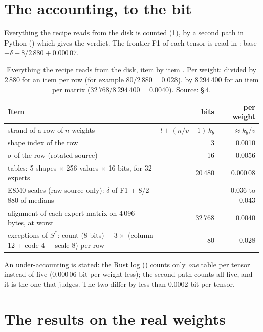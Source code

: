 \section{The accounting, to the bit}\label{t3gen:sec:compta}

Everything the recipe reads from the disk is counted (\cref{t3gen:tab:compta}), by a second path in Python () which gives the verdict. The frontier F1 of each tensor is read in : base $+ \delta + 8/2\,880 + 0.000\,07$.

\begin{table}[tbp]
\centering\footnotesize\setlength{\tabcolsep}{3pt}
\begin{tabularx}{\linewidth}{@{}>{\raggedright\arraybackslash}X r r@{}}
\toprule
Item & bits & per weight \\
\midrule
strand of a row of $n$ weights & $l + (n/v - 1)\,k_b$ & $\approx k_b/v$ \\
shape index of the row & 3 & 0.0010 \\
$\sigma$ of the row (rotated source) & 16 & 0.0056 \\
tables: 5 shapes $\times$ 256 values $\times$ 16 bits, for 32 experts & 20\,480 & 0.000\,08 \\
E8M0 scales (raw source only): $\delta$ of F1 + 8/2\,880 of medians & & 0.036 to 0.043 \\
alignment of each expert matrix on 4\,096 bytes, at worst & 32\,768 & 0.0040 \\
exceptions of $S^{*}$: count (8 bits) + $3 \times$ (column 12 + code 4 + scale 8) per row & 80 & 0.028 \\
\bottomrule
\end{tabularx}
\caption[The accounting of the recipe]{Everything the recipe reads from the disk, item by item \calc. Per weight: divided by 2\,880 for an item per row (for example $80/2\,880 = 0.028$), by 8\,294\,400 for an item per matrix ($32\,768/8\,294\,400 = 0.0040$). Source:  §\,4.}
\label{t3gen:tab:compta}
\end{table}

An under-accounting is stated: the Rust log () counts only \emph{one} table per tensor instead of five (0.000\,06 bit per weight less); the second path counts all five, and it is the one that judges. The two differ by less than 0.0002 bit per tensor.

\section{The results on the real weights}\label{t3gen:sec:resultats}

